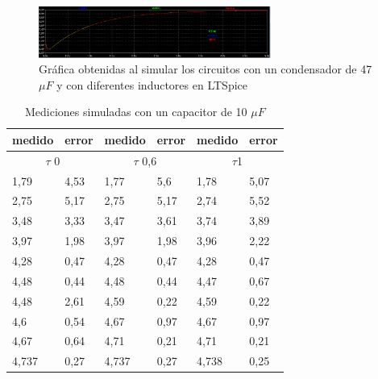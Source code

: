 \documentclass[journal]{IEEEtran}
\begin{document}
\begin{figure}
	\centering
	\includegraphics[width=3in]{img/simulacion100.png}
	\caption{Gráfica obtenidas al simular los circuitos con un condensador de 47 \(\mu F\) y  con diferentes inductores en LTSpice}
	\label{fig:sim100}
\end{figure}
\begin{table}[]
	\centering
	\caption{Mediciones simuladas con un capacitor de 10 \(\mu F\)}
	\label{simulado10}
	\begin{tabular}{|l|l|l|l|l|l|}
		\hline
		medido           & error          & medido           & error          & medido          & error         \\ \hline
		\multicolumn{2}{|c|}{\(\tau \) 0} & \multicolumn{2}{c|}{\(\tau\) 0,6} & \multicolumn{2}{c|}{\(\tau \)1} \\ \hline
		1,79             & 4,53           & 1,77             & 5,6            & 1,78            & 5,07          \\ \hline
		2,75             & 5,17           & 2,75             & 5,17           & 2,74            & 5,52          \\ \hline
		3,48             & 3,33           & 3,47             & 3,61           & 3,74            & 3,89          \\ \hline
		3,97             & 1,98           & 3,97             & 1,98           & 3,96            & 2,22          \\ \hline
		4,28             & 0,47           & 4,28             & 0,47           & 4,28            & 0,47          \\ \hline
		4,48             & 0,44           & 4,48             & 0,44           & 4,47            & 0,67          \\ \hline
		4,48             & 2,61           & 4,59             & 0,22           & 4,59            & 0,22          \\ \hline
		4,6              & 0,54           & 4,67             & 0,97           & 4,67            & 0,97          \\ \hline
		4,67             & 0,64           & 4,71             & 0,21           & 4,71            & 0,21          \\ \hline
		4,737            & 0,27           & 4,737            & 0,27           & 4,738           & 0,25          \\ \hline
	\end{tabular}
\end{table}
\end{document}
